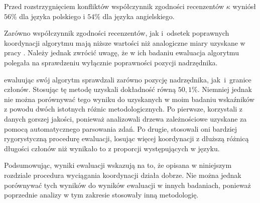 Przed rozstrzygnięciem konfliktów współczynnik zgodności recenzentów $\kappa$ wyniósł $56\%$ dla języka polskiego i $54\%$ dla języka angielskiego.

Zarówno współczynnik zgodności recenzentów, jak i~odsetek poprawnych koordynacji algorytmu mają niższe wartości niż analogiczne miary uzyskane w pracy \cite{przepiorkowski2023conjunct}. Należy jednak zwrócić uwagę, że w ich badaniu ewaluacja algorytmu polegała na sprawdzeniu wyłącznie poprawności pozycji nadrzędnika. 

\cite{przepiorkowski2024argument} ewaluując swój algorytm sprawdzali zarówno pozycję nadrzędnika, jak~i~granice członów. Stosując tę metodę uzyskali dokładność równą $50,1\%$. Niemniej jednak nie można porównywać tego wyniku do uzyskanych w moim badaniu wskaźników z powodu dwóch istotnych różnic metodologicznych. Po pierwsze, \cite{przepiorkowski2024argument} korzystali z danych gorszej jakości, ponieważ analizowali drzewa zależnościowe uzyskane za pomocą automatycznego parsowania zdań. Po drugie, stosowali oni bardziej rygorystyczną procedurę ewaluacji, losując więcej koordynacji z dłuższą różnicą długości członów niż wynikało to z proporcji występujących w języku.

Podsumowując, wyniki ewaluacji wskazują na to, że opisana w niniejszym rozdziale procedura wyciągania koordynacji działa dobrze. Nie można jednak porównywać tych wyników do wyników ewaluacji w innych badaniach, ponieważ poprzednie analizy w tym zakresie stosowały inną metodologię.